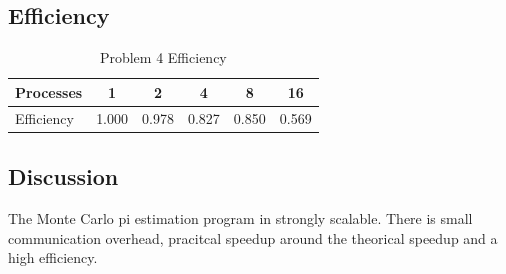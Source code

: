 \documentclass[11pt]{article}
\begin{document}
\subsection{Efficiency}
\label{sec:orgb72db9b}

\begin{table}[htbp]
\caption{Problem 4 Efficiency}
\centering
\begin{tabular}{|l|c|c|c|c|c|}
\hline
Processes & 1 & 2 & 4 & 8 & 16\\
\hline
Efficiency & 1.000 & 0.978 & 0.827 & 0.850 & 0.569\\
\hline
\end{tabular}
\end{table}
\subsection{Discussion}
\label{sec:org8123224}

The Monte Carlo pi estimation program in strongly scalable. There is small communication overhead, pracitcal speedup around the theorical speedup and a high efficiency.
\end{document}
